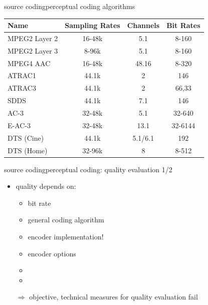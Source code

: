 	\begin{frame}{source coding}{perceptual coding algorithms}
		\begin{table}
			\begin{center}
			\begin{footnotesize}
				\begin{tabular}{lccc}
				\hline
					\textbf{Name} & \textbf{Sampling Rates}	& \textbf{Channels}	& \textbf{Bit Rates} \\
				\hline
				MPEG2 Layer 2	& 16-48k 			& 5.1 	& 8-160\\
				MPEG2 Layer 3	& 8-96k 			& 5.1 	& 8-160\\
				MPEG4 AAC	& 16-48k 			& 48.16 	& 8-320\\
				ATRAC1 	& 44.1k	& 2 	& 146\\
				ATRAC3 	& 44.1k	& 2 	& 66,33\\
				SDDS 	& 44.1k	& 7.1 	& 146\\
				AC-3 	& 32-48k 			& 5.1	& 32-640\\
				E-AC-3 	& 32-48k 			& 13.1	& 32-6144\\
				DTS (Cine) 	& 44.1k 			& 5.1/6.1	& 192\\
				DTS (Home) 	& 32-96k 			& 8	& 8-512\\
				\end{tabular}  
			\end{footnotesize}
			\end{center}
		\end{table}
	\end{frame}		

	\begin{frame}{source coding}{perceptual coding: quality evaluation 1/2}
		\begin{itemize}
			\item	quality depends on:
			\begin{itemize}
				\item	bit rate
				\item	general coding algorithm
				\item	encoder implementation!
				\item	encoder options
				\item	{}
				\item	{}
			\end{itemize}
			\pause
			$\Rightarrow$ objective, technical measures for quality evaluation fail
		\end{itemize}
	\end{frame}		


